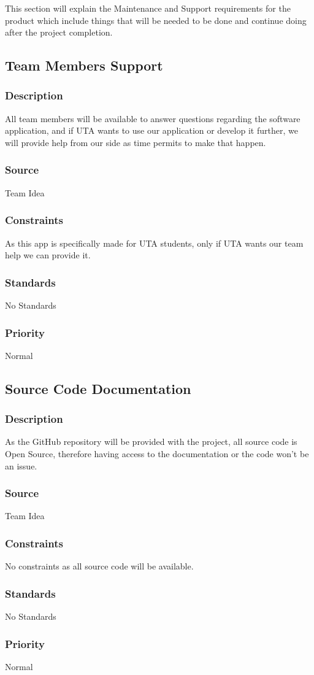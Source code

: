 This section will explain the Maintenance and Support requirements for the product which include things that will be needed to be done and continue doing after the project completion.

\subsection{Team Members Support}
\subsubsection{Description}
All team members will be available to answer questions regarding the software application, and if UTA wants to use our application or develop it further, we will provide help from our side as time permits to make that happen. 
\subsubsection{Source}
Team Idea
\subsubsection{Constraints}
As this app is specifically made for UTA students, only if UTA wants our team help we can provide it.
\subsubsection{Standards}
No Standards
\subsubsection{Priority}
Normal

\subsection{Source Code Documentation}
\subsubsection{Description}
As the GitHub repository will be provided with the project, all source code is Open Source, therefore having access to the documentation or the code won't be an issue.
\subsubsection{Source}
Team Idea
\subsubsection{Constraints}
No constraints as all source code will be available.
\subsubsection{Standards}
No Standards
\subsubsection{Priority}
Normal